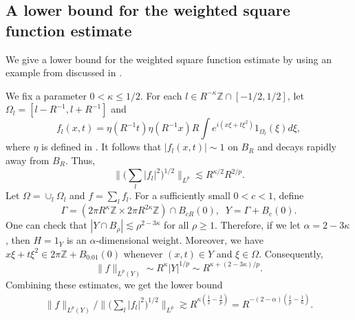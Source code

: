 \documentclass[11pt]{amsart}
\theoremstyle{definition}
\theoremstyle{remark}
\newcommand{\Z}{\mathbb{Z}}
\newcommand{\les}{\lesssim}
\begin{document}
\subsection{A lower bound for the weighted square function estimate}\label{sec:BBCRV}

We give a lower bound for the weighted square function estimate by using an example from \cite{BBCRV0} discussed in .

We fix a parameter $0< \kappa\leq 1/2$. For each $l\in R^{-\kappa} \Z \cap [-1/2,1/2]$, let $\Omega_l = [l-R^{-1},l+R^{-1}]$ and
\[f_l(x,t) = \eta(R^{-1}t)\eta(R^{-1}x) R\int e^{i(x\xi+t\xi^2)}  1_{\Omega_l}(\xi)d\xi,\]
where $\eta$ is defined in .
It follows that $|f_l(x,t)| \sim 1$ on $B_R$ and decays rapidly away from $B_R$. Thus, 
\[ \big\| \big(\sum_l |f_l|^2 \big)^{1/2}\big\|_{L^p} \les R^{\kappa/2} R^{2/p}.   \]
Let $\Omega = \cup_l \Omega_l$ and $f= \sum_{l} f_l$. For a sufficiently small $0<c<1$, define 
\begin{equation}\label{eqn:Gamma}
   \Gamma = (2\pi R^\kappa \Z \times 2\pi R^{2\kappa} \Z ) \cap B_{cR}(0), \;\; Y = \Gamma + B_{c}(0). 
\end{equation}
One can check that $|Y\cap B_\rho| \les \rho^{2-3\kappa}$ for all $\rho \geq 1$. Therefore, if we let $\alpha = 2-3\kappa$, then $H=1_Y$ is an $\alpha$-dimensional weight. 
Moreover, we have $x\xi + t\xi^2 \in 2\pi \Z + B_{0.01}(0)$ whenever $(x,t)\in Y$ and $\xi \in \Omega$. Consequently, 
\[ \| f\|_{L^p(Y)} \sim R^\kappa |Y|^{1/p} \sim R^{\kappa+(2-3\kappa)/p}.\]
Combining these estimates, we get the lower bound
\begin{align}\label{ex_new}
\| f\|_{L^p(Y)} / \big\| \big(\sum_l |f_l|^2 \big)^{1/2}\big\|_{L^p} \gtrsim R^{\kappa(\frac{1}{2} - \frac{3}{p})} = R^{-(2-\alpha)(\frac{1}{p}-\frac{1}{6})}. 
\end{align}
\end{document}
